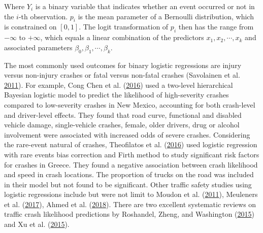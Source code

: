 \documentclass[12pt]{book}
\numberwithin{equation}{chapter}
\begin{document}
Where \(Y_i\) is a binary variable that indicates whether an event occurred or not in the \(i\)-th observation. \(p_i\) is the mean parameter of a Bernoulli distribution, which is constrained on \([0, 1]\). The logit transformation of \(p_i\) then has the range from \(-\infty\) to \(+\infty\), which equals a linear combination of the predictors \(x_1, x_2, \cdots, x_k\) and associated parameters \(\beta_0, \beta_1, \cdots, \beta_k\).

The most commonly used outcomes for binary logistic regressions are injury versus non-injury crashes or fatal versus non-fatal crashes (Savolainen et al. \protect\hyperlink{ref-savolainen2011statistical}{2011}). For example, Cong Chen et al. (\protect\hyperlink{ref-chen2016driver}{2016}) used a two-level hierarchical Bayesian logistic model to predict the likelihood of high-severity crashes compared to low-severity crashes in New Mexico, accounting for both crash-level and driver-level effects. They found that road curve, functional and disabled vehicle damage, single-vehicle crashes, female, older drivers, drug or alcohol involvement were associated with increased odds of severe crashes. Considering the rare-event natural of crashes, Theofilatos et al. (\protect\hyperlink{ref-theofilatos2016predicting}{2016}) used logistic regression with rare events bias correction and Firth method to study significant risk factors for crashes in Greece. They found a negative association between crash likelihood and speed in crash locations. The proportion of trucks on the road was included in their model but not found to be significant. Other traffic safety studies using logistic regressions include but were not limit to Moudon et al. (\protect\hyperlink{ref-moudon2011risk}{2011}), Meuleners et al. (\protect\hyperlink{ref-meuleners2017determinants}{2017}), Ahmed et al. (\protect\hyperlink{ref-ahmed2018effects}{2018}). There are two excellent systematic reviews on traffic crash likelihood predictions by Roshandel, Zheng, and Washington (\protect\hyperlink{ref-roshandel2015impact}{2015}) and Xu et al. (\protect\hyperlink{ref-xu2015calibration}{2015}).
\end{document}
